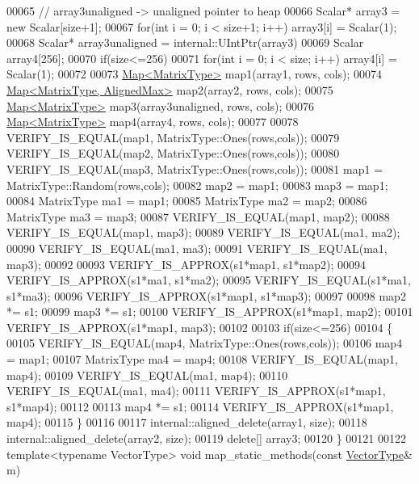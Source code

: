 \begin{DoxyCode}
00065   \textcolor{comment}{// array3unaligned -> unaligned pointer to heap}
00066   Scalar* array3 = \textcolor{keyword}{new} Scalar[size+1];
00067   \textcolor{keywordflow}{for}(\textcolor{keywordtype}{int} i = 0; i < size+1; i++) array3[i] = Scalar(1);
00068   Scalar* array3unaligned = internal::UIntPtr(array3)%
00069   Scalar array4[256];
00070   \textcolor{keywordflow}{if}(size<=256)
00071     \textcolor{keywordflow}{for}(\textcolor{keywordtype}{int} i = 0; i < size; i++) array4[i] = Scalar(1);
00072   
00073   \hyperlink{group___core___module_class_eigen_1_1_map}{Map<MatrixType>} map1(array1, rows, cols);
00074   \hyperlink{group___core___module_class_eigen_1_1_map}{Map<MatrixType, AlignedMax>} map2(array2, rows, cols);
00075   \hyperlink{group___core___module_class_eigen_1_1_map}{Map<MatrixType>} map3(array3unaligned, rows, cols);
00076   \hyperlink{group___core___module_class_eigen_1_1_map}{Map<MatrixType>} map4(array4, rows, cols);
00077   
00078   VERIFY\_IS\_EQUAL(map1, MatrixType::Ones(rows,cols));
00079   VERIFY\_IS\_EQUAL(map2, MatrixType::Ones(rows,cols));
00080   VERIFY\_IS\_EQUAL(map3, MatrixType::Ones(rows,cols));
00081   map1 = MatrixType::Random(rows,cols);
00082   map2 = map1;
00083   map3 = map1;
00084   MatrixType ma1 = map1;
00085   MatrixType ma2 = map2;
00086   MatrixType ma3 = map3;
00087   VERIFY\_IS\_EQUAL(map1, map2);
00088   VERIFY\_IS\_EQUAL(map1, map3);
00089   VERIFY\_IS\_EQUAL(ma1, ma2);
00090   VERIFY\_IS\_EQUAL(ma1, ma3);
00091   VERIFY\_IS\_EQUAL(ma1, map3);
00092   
00093   VERIFY\_IS\_APPROX(s1*map1, s1*map2);
00094   VERIFY\_IS\_APPROX(s1*ma1, s1*ma2);
00095   VERIFY\_IS\_EQUAL(s1*ma1, s1*ma3);
00096   VERIFY\_IS\_APPROX(s1*map1, s1*map3);
00097   
00098   map2 *= s1;
00099   map3 *= s1;
00100   VERIFY\_IS\_APPROX(s1*map1, map2);
00101   VERIFY\_IS\_APPROX(s1*map1, map3);
00102   
00103   \textcolor{keywordflow}{if}(size<=256)
00104   \{
00105     VERIFY\_IS\_EQUAL(map4, MatrixType::Ones(rows,cols));
00106     map4 = map1;
00107     MatrixType ma4 = map4;
00108     VERIFY\_IS\_EQUAL(map1, map4);
00109     VERIFY\_IS\_EQUAL(ma1, map4);
00110     VERIFY\_IS\_EQUAL(ma1, ma4);
00111     VERIFY\_IS\_APPROX(s1*map1, s1*map4);
00112     
00113     map4 *= s1;
00114     VERIFY\_IS\_APPROX(s1*map1, map4);
00115   \}
00116 
00117   internal::aligned\_delete(array1, size);
00118   internal::aligned\_delete(array2, size);
00119   \textcolor{keyword}{delete}[] array3;
00120 \}
00121 
00122 \textcolor{keyword}{template}<\textcolor{keyword}{typename} VectorType> \textcolor{keywordtype}{void} map\_static\_methods(\textcolor{keyword}{const} \hyperlink{struct_vector_type}{VectorType}& m)

\end{DoxyCode}
